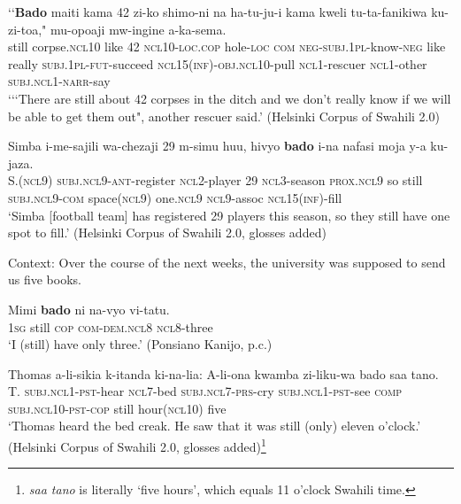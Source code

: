 \begin{exe}
	\ex\label{exAppendixSwahiliScalar1}
	\gll \lq\lq \textbf{Bado} maiti kama 42 zi-ko shimo-ni na ha-tu-ju-i kama kweli tu-ta-fanikiwa ku-zi-toa," mu-opoaji mw-ingine a-ka-sema.\\
	\phantom{\lq\lq}still corpse.\textsc{ncl}10 like 42 \textsc{ncl}10-\textsc{loc}.\textsc{cop} hole-\textsc{loc} \textsc{com} \textsc{neg}-\textsc{subj}.1\textsc{pl}-know-\textsc{neg} like really \textsc{subj}.1\textsc{pl}-\textsc{fut}-succeed \textsc{ncl}15(\textsc{inf})-\textsc{obj}.\textsc{ncl}10-pull \textsc{ncl}1-rescuer \textsc{ncl}1-other \textsc{subj}.\textsc{ncl}1-\textsc{narr}-say\\
	\glt \lq{}{\lq\lq}There are still about 42 corpses in the ditch and we don’t really know if we will be able to get them out", another rescuer said.\rq{ }(Helsinki Corpus of Swahili 2.0)

	\ex\label{exAppendixSwahiliScalar2}	
	\gll Simba i-me-sajili wa-chezaji 29 m-simu huu, hivyo 	\textbf{bado} i-na nafasi moja y-a ku-jaza.\\
	S.(\textsc{ncl}9) \textsc{subj}.\textsc{ncl}9-\textsc{ant}-register \textsc{ncl}2-player 29 \textsc{ncl}3-season \textsc{prox}.\textsc{ncl}9 so still \textsc{subj}.\textsc{ncl}9-\textsc{com} space(\textsc{ncl}9) one.\textsc{ncl}9 \textsc{ncl}9-assoc \textsc{ncl}15(\textsc{inf})-fill\\
	\glt \lq Simba [football team] has registered 29 players this season, so they still have one spot to fill.\rq{ }(Helsinki Corpus of Swahili 2.0, glosses added)\
	
	\ex\label{exAppendixSwahiliScalar3}
	Context: Over the course of the next weeks, the university was supposed to send us five books.\\
	\begin{xlist}
	\gll Mimi \textbf{bado} ni na-vyo vi-tatu.\\
	1\textsc{sg} still \textsc{cop} \textsc{com}-\textsc{dem}.\textsc{ncl}8 \textsc{ncl}8-three\\
	\glt \lq I (still) have only three.' (Ponsiano Kanijo, p.c.)
	\end{xlist}

	\ex\label{exAppendixSwahiliScalar4}
	\gll Thomas a-li-sikia k-itanda ki-na-lia: A-li-ona kwamba zi-liku-wa bado saa tano.\\
	 T. \textsc{subj}.\textsc{ncl}1-\textsc{pst}-hear \textsc{ncl}7-bed \textsc{subj}.\textsc{ncl}7-\textsc{prs}-cry \textsc{subj}.\textsc{ncl}1-\textsc{pst}-see \textsc{comp} \textsc{subj}.\textsc{ncl}10-\textsc{pst}-\textsc{cop} still hour(\textsc{ncl}10) five\\
	 \glt \lq Thomas heard the bed creak. He saw that it was still (only) eleven o'clock.\rq{ }(Helsinki Corpus of Swahili 2.0, glosses added)\footnote{\textit{saa tano} is literally \lq five hours\rq{}, which equals 11 o'clock Swahili time.} 
\end{exe}


